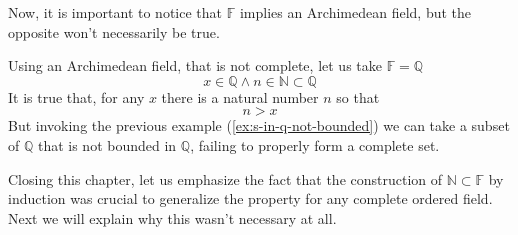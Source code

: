 Now, it is important to notice that $\mathbb{F}$ implies an Archimedean field, but the opposite won't necessarily be true.

\begin{example}
Using an Archimedean field, that is not complete, let us take $\mathbb{F} = \mathbb{Q}$
$$x \in \mathbb{Q} \wedge n \in \mathbb{N} \subset \mathbb{Q}$$
It is true that, for any $x$ there is a natural number $n$ so that $$n>x$$But invoking the previous example (\cref{ex:s-in-q-not-bounded}) we can take a subset of $\mathbb{Q}$ that is not bounded in $\mathbb{Q}$, failing to properly form a complete set.
\end{example}

Closing this chapter, let us emphasize the fact that the construction of $\mathbb{N} \subset \mathbb{F}$ by induction was crucial to generalize the property for any complete ordered field. Next we will explain why this wasn't necessary at all.

